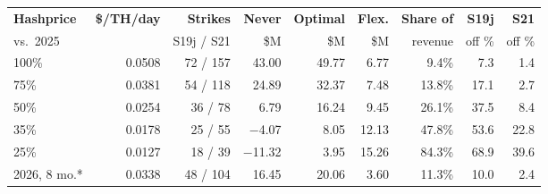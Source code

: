 \begin{table}[htbp]
  \centering
  \scriptsize
  \setlength{\tabcolsep}{1.8pt}
  \begin{tabular}{lrrrrrrrr}
    \hline
    \textbf{Hashprice} & \textbf{\$/TH/day} & \textbf{Strikes} & \textbf{Never} & \textbf{Optimal} & \textbf{Flex.} & \textbf{Share of} & \textbf{S19j} & \textbf{S21} \\
    vs.\ 2025 & & S19j / S21 & \$M & \$M & \$M & revenue & off \% & off \% \\
    \hline
    100\% & 0.0508 & 72 / 157 & 43.00 & 49.77 & 6.77 & 9.4\% & 7.3 & 1.4 \\
    75\% & 0.0381 & 54 / 118 & 24.89 & 32.37 & 7.48 & 13.8\% & 17.1 & 2.7 \\
    50\% & 0.0254 & 36 / 78 & 6.79 & 16.24 & 9.45 & 26.1\% & 37.5 & 8.4 \\
    35\% & 0.0178 & 25 / 55 & $-$4.07 & 8.05 & 12.13 & 47.8\% & 53.6 & 22.8 \\
    25\% & 0.0127 & 18 / 39 & $-$11.32 & 3.95 & 15.26 & 84.3\% & 68.9 & 39.6 \\
    \hline
    2026, 8 mo.* & 0.0338 & 48 / 104 & 16.45 & 20.06 & 3.60 & 11.3\% & 10.0 & 2.4 \\
    \hline
  \end{tabular}

\end{table}
